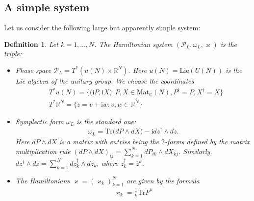 \documentclass[12pt]{article}
\newtheorem{defn}{Definition}[section]
\numberwithin{equation}{section}
\theoremstyle{definition}
\newcommand {\ii} {\mathrm{i}}
\begin{document}
 \subsection{A simple system}
 Let us consider the following large but apparently simple system:
 \begin{defn}\normalfont\label{simpls}
 Let $k = 1, ..., N$. The Hamiltonian system $(\mathcal{P}_{L}, \omega_{L}, \boldsymbol{\varkappa})$ is the triple:
 \begin{itemize}[label=\raisebox{0.25ex}{\tiny$\bullet$}]
     \item 
     Phase space $\mathcal{P}_{L} = T^{*}(u(N) \times \mathbb{R}^{N})$. Here $u(N)=\mathrm{Lie}(U(N))$ is the Lie algebra of the unitary group. We choose the coordinates
     \begin{align*}
         &T^{*}u(N)= \big\{ \big( {\ii} P, {\ii} X \big) : P, X \in \mathrm{Mat}_{\mathbb{C}}(N), P^{\dagger} = P, X^{\dagger} = X \big\}\\
         &T^{*}\mathbb{R}^{N} = \big\{z = v + {\ii} w: v, w \in \mathbb{R}^N \big\}
     \end{align*}
     \item 
     Symplectic form $\omega_{L}$ is the standard one:
     \begin{align*}
         \omega_{L} = \mathrm{Tr}\big( dP \wedge dX \big) - {\ii}dz^{\dagger} \wedge dz.
     \end{align*}
     Here $dP \wedge dX$ is a matrix with entries being the $2$-forms defined by the matrix multiplication rule $\left( dP \wedge dX\right)_{ij} = \sum\limits_{k = 1}^{N}dP_{ik} \wedge dX_{kj}$. Similarly, $dz^{\dagger} \wedge dz = \sum\limits_{k = 1}^{N}dz^{\dagger}_{k} \wedge dz_{k}$, where $z_{k}^{\dagger} = {\bar z}^{k}$. 
     \item
     The Hamiltonians $\boldsymbol{\varkappa} = \left( {\varkappa}_{k} \right)_{k=1}^{N}$ are given by the formula
     \begin{align*}
         \varkappa_k = \frac{1}{k} \mathrm{Tr} P^k
     \end{align*}
 \end{itemize}
  \end{defn}
\end{document}
